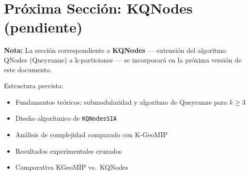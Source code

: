 \documentclass[12pt,letterpaper]{article}
\theoremstyle{definition}
\theoremstyle{remark}
\begin{document}
\section*{Próxima Sección: KQNodes (pendiente)}

\begin{blueBox}
\textbf{Nota:} La sección correspondiente a \textbf{KQNodes} --- extensión del algoritmo
QNodes (Queyranne) a k-particiones --- se incorporará en la próxima versión de este
documento.

Estructura prevista:
\begin{itemize}
  \item Fundamentos teóricos: submodularidad y algoritmo de Queyranne para $k \geq 3$
  \item Diseño algorítmico de \texttt{KQNodesSIA}
  \item Análisis de complejidad comparado con K-GeoMIP
  \item Resultados experimentales cruzados
  \item Comparativa KGeoMIP vs.\ KQNodes
\end{itemize}
\end{blueBox}
\end{document}
